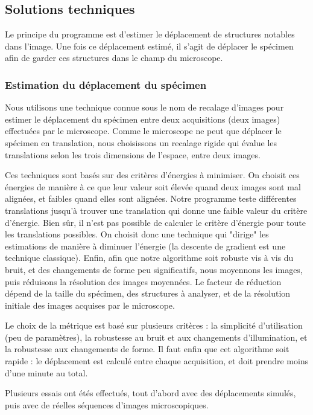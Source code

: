 \subsection{Solutions techniques}

Le principe du programme est d'estimer le déplacement de structures notables dans l'image.
Une fois ce déplacement estimé, il s'agit de déplacer le spécimen afin de garder ces structures dans le champ du microscope.

\subsubsection{Estimation du déplacement du spécimen}
Nous utilisons une technique connue sous le nom de recalage d'images pour estimer le déplacement du spécimen entre deux acquisitions (deux images) effectuées par le microscope.
Comme le microscope ne peut que déplacer le spécimen en translation, nous choisissons un recalage rigide qui évalue les translations selon les trois dimensions de l'espace, entre deux images.

Ces techniques sont basés sur des critères d'énergies à minimiser.
On choisit ces énergies de manière à ce que leur valeur soit élevée quand deux images sont mal alignées,
et faibles quand elles sont alignées. Notre programme teste différentes translations jusqu'à trouver une translation
qui donne une faible valeur du critère d'énergie.
Bien sûr, il n'est pas possible de calculer le critère d'énergie pour toute les translations possibles.
On choisit donc une technique qui "dirige" les estimations de manière à diminuer l'énergie
(la descente de gradient est une technique classique).
Enfin, afin que notre algorithme soit robuste vis à vis du bruit, et des changements de forme peu significatifs,
nous moyennons les images, puis réduisons la résolution des images moyennées.
Le facteur de réduction dépend de la taille du spécimen, des structures à analyser,
et de la résolution initiale des images acquises par le microscope.

Le choix de la métrique est basé sur plusieurs critères : la simplicité d'utilisation (peu de paramètres),
la robustesse au bruit et aux changements d'illumination, et la robustesse aux changements de forme. Il faut enfin que cet algorithme soit rapide : le déplacement est calculé entre chaque acquisition, et doit prendre moins d'une minute au total.

Plusieurs essais ont étés effectués, tout d'abord avec des déplacements simulés,
puis avec de réelles séquences d'images microscopiques.

